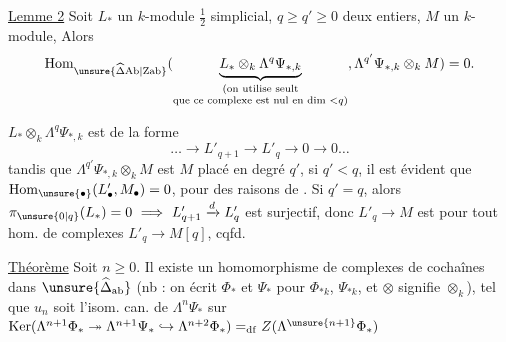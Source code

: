\uline{Lemme 2} Soit $L_*$ un $k$-module $\frac12$ simplicial,     $q\geq q'\geq0$ deux entiers, $M$ un $k$-module,  Alors
\[
\operatorname{Hom}_{\unsure{\widehat\Delta\mathrm{Ab}|\mathrm{Zab}}}
 (\underbrace{L_*\otimes_k\Lambda^q\Psi_{*,k}}_{\substack{\text{(on utilise seult}\\\text{que ce complexe est nul en dim }<q\text{)}}},\Lambda^{q'}\Psi_{*,k}\otimes_k M)=0.
\]


   $L_*\otimes_k\Lambda^q\Psi_{*,k}$ est   de la forme
\[
\ldots\longrightarrow L'_{q+1}\longrightarrow L'_q\longrightarrow0\longrightarrow0\ldots
\]
tandis que $\Lambda^{q'}\Psi_{*,k}\otimes_k M$ est $M$ placé en degré $q'$,  si $q'<q$, il est évident que $\operatorname{Hom}_{\unsure{\bullet}}(L'_{\bullet},M_{\bullet})=0$, pour des raisons de . Si $q'=q$,
alors $\pi_{\unsure{0|q}}(L_*)=0\ \Longrightarrow\ L'_{q+1}\xrightarrow{d}L'_q$ est surjectif, donc $L'_q\longrightarrow M$ est  pour tout hom. de complexes  $L'_{q}\longrightarrow M[q]$, cqfd.

\uline{Théorème} Soit $n\geq0$. Il existe un homomorphisme de complexes de cochaînes dans $\unsure{\widehat{\Delta}_{\mathrm{ab}}}$
(nb : on écrit $\Phi_*$ et $\Psi_*$ pour $\Phi_{*k}$, $\Psi_{*k}$, et $\otimes$ signifie $\otimes_k$), tel que $u_n$ soit l'isom. can. de $\Lambda^n\Psi_*$ sur $\operatorname{Ker}(\Lambda^{n+1}\Phi_*\twoheadrightarrow\Lambda^{n+1}\Psi_*\hookrightarrow\Lambda^{n+2}\Phi_*)=_{\mathrm{df}}Z(\Lambda^{\unsure{n+1}}\Phi_*)$
